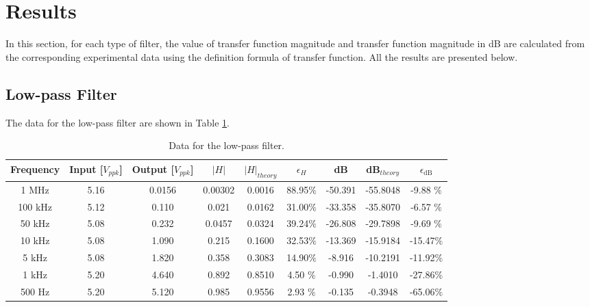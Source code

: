 \documentclass{article}
\begin{document}
\section{Results}
In this section, for each type of filter, the value of transfer function magnitude and transfer function magnitude in dB are calculated from the corresponding experimental data using the definition formula of transfer function. All the results are presented below.

\subsection{Low-pass Filter}
The data for the low-pass filter are shown in Table \ref{TableLowpass}.

\begin{table}[H]\centering
    \begin{tabular}{ccccccccc}
        \toprule
        Frequency & Input [$V_{ppk}$] & Output [$V_{ppk}$] & $|H|$  & $|H|_{theory}$ & $\epsilon_H$ & dB       & dB$_{theory}$ & $\epsilon_{\text{dB}}$ \\
        \midrule
        1 MHz     & 5.16              & 0.0156 & 0.00302 & 0.0016         & 88.95$\%$    & -50.391 & -55.8048      & -9.88 $\%$             \\
        100 kHz   & 5.12              & 0.110  & 0.021   & 0.0162         & 31.00$\%$    & -33.358 & -35.8070      & -6.57 $\%$             \\
        50 kHz    & 5.08              & 0.232  & 0.0457  & 0.0324         & 39.24$\%$    & -26.808 & -29.7898      & -9.69 $\%$             \\
        10 kHz    & 5.08              & 1.090  & 0.215   & 0.1600         & 32.53$\%$    & -13.369 & -15.9184      & -15.47$\%$              \\
        5 kHz     & 5.08              & 1.820  & 0.358   & 0.3083         & 14.90$\%$    & -8.916  & -10.2191      & -11.92$\%$              \\
        1 kHz     & 5.20              & 4.640  & 0.892   & 0.8510         & 4.50 $\%$    & -0.990  & -1.4010       & -27.86$\%$               \\
        500 Hz    & 5.20              & 5.120  & 0.985   & 0.9556         & 2.93 $\%$    & -0.135  & -0.3948       & -65.06$\%$              \\
        \bottomrule
    \end{tabular}
    \caption{Data for the low-pass filter.}\label{TableLowpass}
\end{table}
\end{document}
